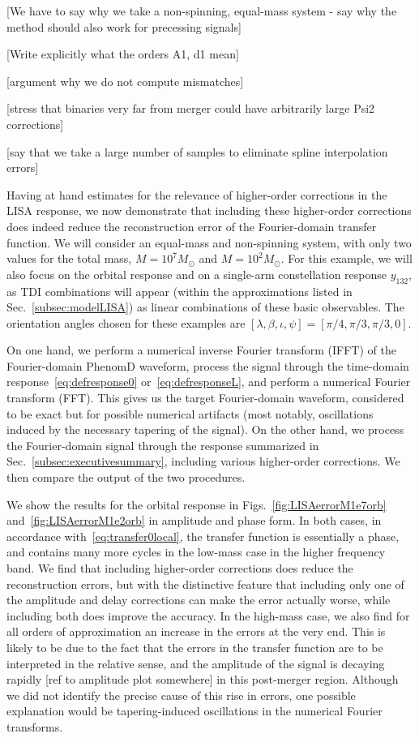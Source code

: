 \documentclass[aps,showpacs,twocolumn,
prd,superscriptaddress,nofootinbib]{revtex4-1}
\newcommand{\Msol}{M_{\odot}}
\newcommand{\SM}[1]{{\color{Red} #1}}
\begin{document}
\SM{[We have to say why we take a non-spinning, equal-mass system - say why the method should also work for precessing signals]}

\SM{[Write explicitly what the orders A1, d1 mean]}

\SM{[argument why we do not compute mismatches]}

\SM{[stress that binaries very far from merger could have arbitrarily large Psi2 corrections]}

\SM{[say that we take a large number of samples to eliminate spline interpolation errors]}

Having at hand estimates for the relevance of higher-order corrections in the LISA response, we now demonstrate that including these higher-order corrections does indeed reduce the reconstruction error of the Fourier-domain transfer function. We will consider an equal-mass and non-spinning system, with only two values for the total mass, $M=10^{7} \Msol$ and $M=10^{2} \Msol$. For this example, we will also focus on the orbital response and on a single-arm constellation response $y_{132}$, as TDI combinations will appear (within the approximations listed in Sec.~\ref{subsec:modelLISA}) as linear combinations of these basic observables. The orientation angles chosen for these examples are $[\lambda,\beta,\iota,\psi] = [\pi/4,\pi/3,\pi/3,0]$.

On one hand, we perform a numerical inverse Fourier transform (IFFT) of the Fourier-domain PhenomD waveform, process the signal through the time-domain response~\eqref{eq:defresponse0} or~\eqref{eq:defresponseL}, and perform a numerical Fourier transform (FFT). This gives us the target Fourier-domain waveform, considered to be exact but for possible numerical artifacts (most notably, oscillations induced by the necessary tapering of the signal). On the other hand, we process the Fourier-domain signal through the response summarized in Sec.~\ref{subsec:executivesummary}, including various higher-order corrections. We then compare the output of the two procedures.

We show the results for the orbital response in Figs.~\ref{fig:LISAerrorM1e7orb} and~\ref{fig:LISAerrorM1e2orb} in amplitude and phase form. In both cases, in accordance with~\eqref{eq:transfer0local}, the transfer function is essentially a phase, and contains many more cycles in the low-mass case in the higher frequency band. We find that including higher-order corrections does reduce the reconstruction errors, but with the distinctive feature that including only one of the amplitude and delay corrections can make the error actually worse, while including both does improve the accuracy. In the high-mass case, we also find for all orders of approximation an increase in the errors at the very end. This is likely to be due to the fact that the errors in the transfer function are to be interpreted in the relative sense, and the amplitude of the signal is decaying rapidly \SM{[ref to amplitude plot somewhere]} in this post-merger region. Although we did not identify the precise cause of this rise in errors, one possible explanation would be tapering-induced oscillations in the numerical Fourier transforms.
\end{document}
